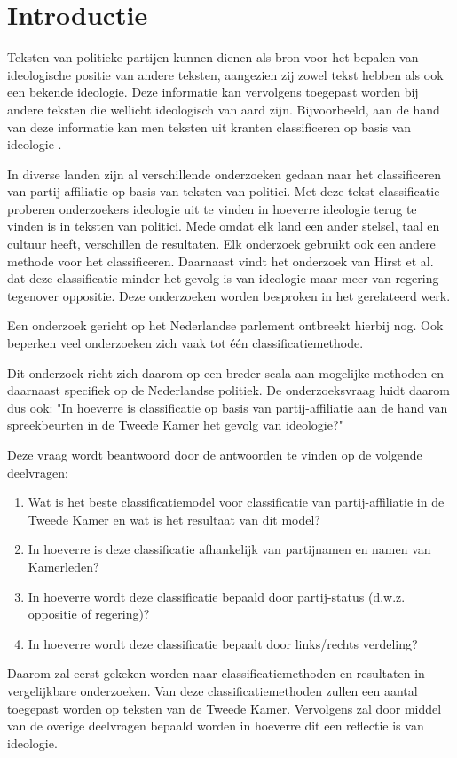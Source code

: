 \section{Introductie}
\label{sec:intro}
Teksten van politieke partijen kunnen dienen als bron voor het bepalen van ideologische positie van andere teksten, aangezien zij zowel tekst hebben als ook een bekende ideologie. Deze informatie kan vervolgens toegepast worden bij andere teksten die wellicht ideologisch van aard zijn. Bijvoorbeeld, aan de hand van deze informatie kan men teksten uit kranten classificeren op basis van ideologie \cite{DBLP:journals/corr/Biessmann16,Hirst_textto}.\par
In diverse landen zijn al verschillende onderzoeken gedaan naar het classificeren van partij-affiliatie op basis van teksten van politici\cite{Ferreira2016UsingTT,DBLP:journals/corr/Biessmann16}. Met deze tekst classificatie proberen onderzoekers ideologie uit te vinden in hoeverre ideologie terug te vinden is in teksten van politici. Mede omdat elk land een ander stelsel, taal en cultuur heeft, verschillen de resultaten. Elk onderzoek gebruikt ook een andere methode voor het classificeren. Daarnaast vindt het onderzoek van Hirst et al. \cite{Hirst_textto} dat deze classificatie minder het gevolg is van ideologie maar meer van regering tegenover oppositie. Deze onderzoeken worden besproken in het gerelateerd werk.\par
Een onderzoek gericht op het Nederlandse parlement ontbreekt hierbij nog. Ook beperken veel onderzoeken zich vaak tot één classificatiemethode.\par
Dit onderzoek richt zich daarom op een breder scala aan mogelijke methoden en daarnaast specifiek op de Nederlandse politiek. De onderzoeksvraag luidt daarom dus ook: "In hoeverre is classificatie op basis van partij-affiliatie aan de hand van spreekbeurten in de Tweede Kamer het gevolg van ideologie?"\par
Deze vraag wordt beantwoord door de antwoorden te vinden op de volgende deelvragen:
\begin{enumerate}
    \item Wat is het beste classificatiemodel voor classificatie van partij-affiliatie in de Tweede Kamer en wat is het resultaat van dit model?
    \item In hoeverre is deze classificatie afhankelijk van partijnamen en namen van Kamerleden?
    \item In hoeverre wordt deze classificatie bepaald door partij-status (d.w.z. oppositie of regering)?
    \item In hoeverre wordt deze classificatie bepaalt door links/rechts verdeling?
\end{enumerate}
Daarom zal eerst gekeken worden naar classificatiemethoden en resultaten in vergelijkbare onderzoeken. Van deze classificatiemethoden zullen een aantal toegepast worden op teksten van de Tweede Kamer. Vervolgens zal door middel van de overige deelvragen bepaald worden in hoeverre dit een reflectie is van ideologie.


